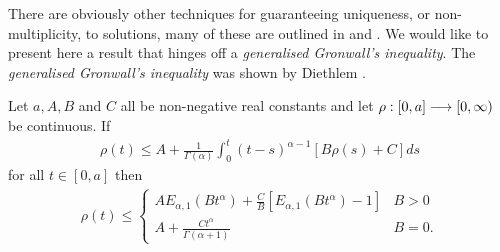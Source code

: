 There are obviously other techniques for guaranteeing uniqueness, or non-multiplicity, to solutions, many of these are outlined in \cite{Tisdell2012} and \cite{Podlubny1999}. We would like to present here a result that hinges off a \emph{generalised Gronwall's inequality}. The \emph{generalised Gronwall's inequality}  was shown by Diethlem \cite{Diethelm2004_2}.

\begin{mdframed}[innertopmargin=10pt]
\begin{lemma}
	\label{lem:gronwall}
	Let $ a, A, B $ and $ C $ all be non-negative real constants and let $ \rho:[0,a] \longrightarrow [0, \infty) $ be continuous. If
	\begin{align*}	
		\rho(t) \leq A + \frac{1}{\Gamma(\alpha)} \int_0^t (t-s)^{\alpha-1}[ B \rho(s) + C] ds
	\end{align*}
	for all $ t \in [0, a] $ then 
	\begin{align}
		\rho(t) \leq 
		\begin{cases}
			AE_{\alpha,1}(B t^\alpha) + \frac{C}{B}[E_{\alpha, 1}(Bt^\alpha) - 1] & B > 0 \\
			A + \frac{Ct^\alpha}{\Gamma(\alpha + 1)} & B = 0.
		\end{cases}
	\end{align}
\end{lemma}
\end{mdframed}
